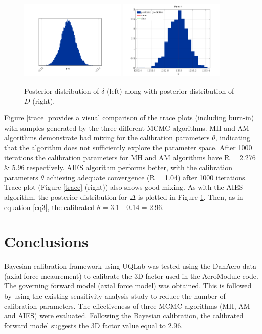 \documentclass[11pt]{article}
\begin{document}
\begin{figure}
\centering
\includegraphics[width=0.45\textwidth]{ post1.png}
\includegraphics[width=0.45\textwidth]{ y1.png}
\caption{Posterior distribution of $\delta$ (left) along with posterior distribution of $D$ (right).}
\label{post}
\end{figure}



Figure \ref{trace}  provides a visual comparison of
the trace plots (including burn-in)
with samples generated by the three different MCMC algorithms. MH and AM algorithms demonstrate
bad mixing for the calibration parameters $\theta$, indicating that the algorithm does not sufficiently
explore the parameter space. After 1000 iterations
the calibration parameters for MH and AM algorithms have \^{R} = 2.276 \& 5.96 respectively. AIES algorithm performs
better, with the calibration parameters $\theta$ achieving
adequate convergence (\^{R} = 1.04) after 1000 iterations.
Trace plot (Figure \ref{trace} (right)) also shows good mixing. As with the AIES algorithm, the posterior distribution for $\Delta$ is plotted in Figure \ref{post}. Then, as in equation \ref{eq3}, the calibrated  $\theta$ = 3.1 - 0.14 = 2.96. 


\section{Conclusions}
Bayesian calibration framework using UQLab was tested using the DanAero data (axial force meaurement) to calibrate the 3D factor used in the AeroModule code. The governing forward model (axial force model) was obtained. This is followed by using the existing sensitivity analysis study to reduce the number of calibration parameters. The effectiveness of three MCMC algorithms (MH, AM and AIES) were
evaluated. Following the Bayesian calibration, the calibrated forward model suggests the 3D factor value equal to 2.96.
\medskip

 
\end{document}
